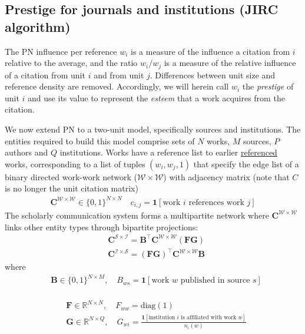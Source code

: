 \documentclass[10pt]{article}
\begin{document}
\subsection{Prestige for journals and institutions (JIRC algorithm)}

The PN influence per reference $w_i$ is a measure of the influence a citation from $i$ relative to the average, and the ratio $w_i/w_j$ is a measure of the relative influence of a citation from unit $i$ and from unit $j$. Differences between unit size and reference density are removed. Accordingly, we will herein call $w_i$ the \textit{prestige} of unit $i$ and use its value to represent the \textit{esteem} that a work acquires from the citation.   

We now extend PN to a two-unit model, specifically sources and institutions. The entities required to build this model comprise sets of $N$ works, $M$ sources, $P$ authors and $Q$ institutions. Works have a reference list to earlier \underline{referenced} works, corresponding to a list of tuples $(w_i, w_j, 1)$ that specify the edge list of a binary directed work-work network ($\mathcal{W \times W}$) with adjacency matrix (note that $C$ is no longer the unit citation matrix) 
\begin{align}
\mathbf{C}^{\mathcal{W \times W}} \in \{0, 1\}^{N \times N} \quad c_{i,j} = \mathbf{1}[\text{work $i$ references work $j$}]
\end{align}
The scholarly communication system forms a multipartite network where $\mathbf{C}^{\mathcal{W \times W}}$ links other entity types through bipartite projections:
\begin{align}
	&\mathbf{C}^{\mathcal{S \times I}} = \mathbf{B}^\top \mathbf{C}^{\mathcal{W \times W}} (\mathbf{F}\mathbf{G}) \\
	&\mathbf{C}^{\mathcal{I \times S}} = (\mathbf{F}\mathbf{G})^\top \mathbf{C}^{\mathcal{W \times W}} \mathbf{B}
\end{align}
where
\begin{align}
	&\mathbf{B} \in \{0,1\}^{N \times M}, \quad B_{ws} = \mathbf{1}[\text{work $w$ published in source $s$}]
\end{align}
 \\
\begin{align}
	&\mathbf{F} \in \mathbb{R}^{N \times N}, \quad F_{ww} = \text{diag}(1)\\
	&\mathbf{G} \in \mathbb{R}^{N \times Q}, \quad G_{wi} = \frac{\mathbf{1}[\text{institution $i$ is affiliated with work $w$}]}{n_i(w)}
\end{align}
\end{document}
